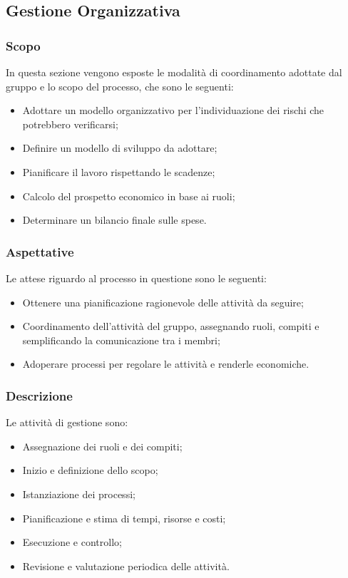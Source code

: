 \subsection{Gestione Organizzativa}
\subsubsection{Scopo}
In questa sezione vengono esposte le modalità di coordinamento adottate dal gruppo e lo scopo del processo, che sono le seguenti:
\begin{itemize}
\item Adottare un modello organizzativo per l'individuazione dei rischi che potrebbero verificarsi;
\item Definire un modello di sviluppo da adottare;
\item Pianificare il lavoro rispettando le scadenze;
\item Calcolo del prospetto economico in base ai ruoli;
\item Determinare un bilancio finale sulle spese.

\end{itemize}
\subsubsection{Aspettative}
Le attese riguardo al processo in questione sono le seguenti: 
\begin{itemize}
\item Ottenere una pianificazione ragionevole delle attività da seguire;
\item Coordinamento dell'attività del gruppo, assegnando ruoli, compiti e semplificando la comunicazione tra i membri;
\item Adoperare processi per regolare le attività e renderle economiche.

\end{itemize}

\subsubsection{Descrizione}
Le attività  di gestione sono: 
\begin{itemize}
\item Assegnazione dei ruoli e dei compiti;
\item Inizio e definizione dello scopo;
\item Istanziazione dei processi;
\item Pianificazione e stima di tempi, risorse e costi;
\item Esecuzione e controllo;
\item Revisione e valutazione periodica delle attività.
\end{itemize}

